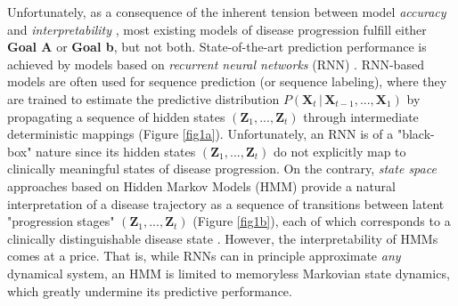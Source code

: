 \documentclass[twoside,11pt]{article}
\begin{document}
Unfortunately, as a consequence of the inherent tension between model {\it accuracy} and {\it interpretability} \cite{lipton2016mythos}, most existing models of disease progression fulfill either {\bf Goal A} or {\bf Goal b}, but not both. State-of-the-art prediction performance is achieved by models based on {\it recurrent neural networks} (RNN) \cite{lim2018disease,lipton2015learning,choi2016doctor}. RNN-based models are often used for sequence prediction (or sequence labeling), where they are trained to estimate the predictive distribution \mbox{\footnotesize $P(\boldsymbol{X}_t \,|\,\boldsymbol{X}_{t-1}, . . . ,\boldsymbol{X}_{1})$} by propagating a sequence of hidden states \mbox{\footnotesize $(\boldsymbol{Z}_1, . . . , \boldsymbol{Z}_t)$} through intermediate deterministic mappings (Figure \ref{fig1a}). Unfortunately, an RNN is of a "black-box" nature since its hidden states \mbox{\footnotesize $(\boldsymbol{Z}_1, . . . , \boldsymbol{Z}_t)$} do not explicitly map to clinically meaningful states of disease progression. On the contrary, {\it state space} approaches based on Hidden Markov Models (HMM) provide a natural interpretation of a disease trajectory as a sequence of transitions between latent "progression stages" \mbox{\footnotesize $(\boldsymbol{Z}_1, . . . , \boldsymbol{Z}_t)$} (Figure \ref{fig1b}), each of which corresponds to a clinically distinguishable disease state \cite{alaa2016hidden,liu2015efficient,wang2014unsupervised}. However, the interpretability of HMMs comes at a price. That is, while RNNs can in principle approximate {\it any} dynamical system, an HMM is limited to memoryless Markovian state dynamics, which greatly undermine its predictive performance. 
\end{document}
